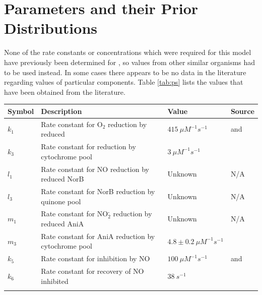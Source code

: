\section{Parameters and their Prior Distributions}

None of the rate constants or concentrations which were required for this model have previously been determined for \Nsm, so values from other similar organisms had to be used instead. In some cases there appears to be no data in the literature regarding values of particular components. Table \ref{tab:ps} lists the values that have been obtained from the literature.

\begin{table}[tbp]
\begin{center}
\begin{tabular}{>{\centering}m{1.7cm}>{\centering}m{6.2cm}>{\centering}m{2.5cm}>{\centering}m{2.8cm}}
\toprule
\textbf{Symbol} & \textbf{Description} & \textbf{Value} & \textbf{Source}
\tabularnewline
\midrule
$k_1$ & Rate constant for O$_{\textrm{2}}$ reduction by reduced \cbbthree{} & $415~\mu M^{-1} s^{-1}$ & \citet{Forte2001} and \citet{Hunter2007}
\tabularnewline\noalign{\smallskip}\hline\noalign{\smallskip}

$k_3$ & Rate constant for \cbbthree{} reduction by cytochrome pool & $3~\mu M^{-1} s^{-1}$ & \citet{Chang2010}
\tabularnewline\noalign{\smallskip}\hline\noalign{\smallskip}

$l_1$ & Rate constant for NO reduction by reduced NorB & Unknown & N/A
\tabularnewline\noalign{\smallskip}\hline\noalign{\smallskip}

$l_3$ & Rate constant for NorB reduction by quinone pool & Unknown & N/A
\tabularnewline\noalign{\smallskip}\hline\noalign{\smallskip}

$m_1$ & Rate constant for NO$_{\textrm{2}}^{\textrm{-}}$ reduction by reduced AniA & Unknown & N/A
\tabularnewline\noalign{\smallskip}\hline\noalign{\smallskip}

$m_3$ & Rate constant for AniA reduction by cytochrome pool & $4.8\pm0.2~\mu M^{-1}s^{-1}$ & \citet{Nojiri2009}
\tabularnewline\noalign{\smallskip}\hline\noalign{\smallskip}

$k_5$ & Rate constant for \cbbthree{} inhibition by NO & $100~\mu M ^{-1} s ^{-1}$ & \citet{Giuffre2000} and \citet{Blackmore1991}
\tabularnewline\noalign{\smallskip}\hline\noalign{\smallskip}

$k_6$ & Rate constant for recovery of NO inhibited \cbbthree{} & $38~s^{-1}$ & \citet{Rock2005}
\tabularnewline\noalign{\smallskip}\hline\noalign{\smallskip}


\end{tabular}
\end{center}
\end{table}
